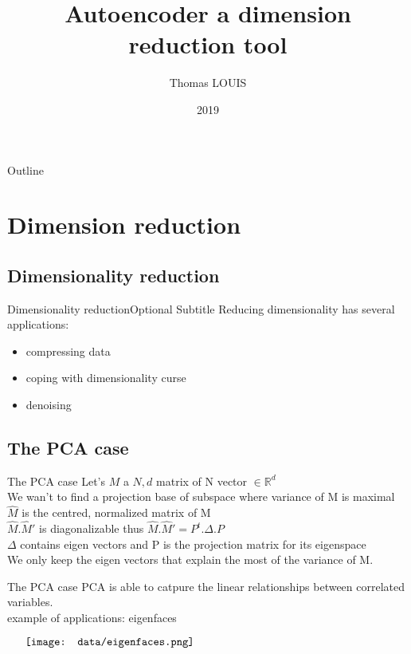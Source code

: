 \documentclass{beamer}
\title{Autoencoder a dimension reduction tool}
\author{Thomas LOUIS}
\date{2019}
\newcommand{\reels}{\mathbb{R}}
\begin{document}
\begin{frame}
  \titlepage
\end{frame}

\begin{frame}{Outline}
  \tableofcontents
\end{frame}

\section{Dimension reduction}

\subsection{Dimensionality reduction}

\begin{frame}{Dimensionality reduction}{Optional Subtitle}
    Reducing dimensionality has several applications:
    \begin{itemize}
	    \item compressing data
	    \item coping with dimensionality curse
            \item denoising
    \end{itemize}
\end{frame}

\subsection{The PCA case}
\begin{frame}{The PCA case}
    Let's $M$ a ${N, d}$ matrix  of N vector $\in \reels^{d}$\\
    We wan't to find a projection base of subspace where variance of M is maximal \\
    $\hat{M}$ is the centred, normalized matrix of M \\
    $\hat{M}.\hat{M}'$ is diagonalizable thus $\hat{M}.\hat{M}' = P^{t}.\Delta.P$ \\
    $\Delta$ contains eigen vectors and P is the projection matrix for its eigenspace \\
    We only keep the eigen vectors that explain the most of the variance of M. \\
\end{frame}

\begin{frame}{The PCA case}
    PCA is able to catpure the linear relationships between correlated variables. \\
    example of applications: eigenfaces \\
    \begin{minipage}{6in}
    \centering
    $\vcenter{
    \texttt{[image: data/eigenfaces.png]}
    }$
    \end{minipage}
\end{frame}
\end{document}
